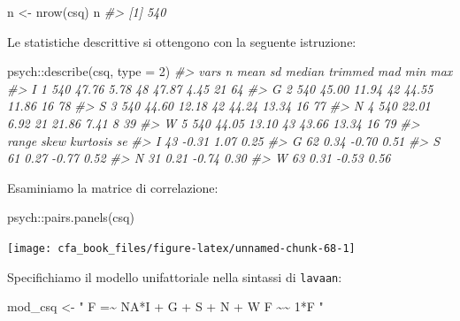 \documentclass[
  11pt,
]{krantz}
\makeatletter
\newenvironment{Shaded}{\begin{snugshade}}{\end{snugshade}}
\newcommand{\AttributeTok}[1]{\textcolor[rgb]{0.61,0.61,0.61}{#1}}
\newcommand{\CommentTok}[1]{\textcolor[rgb]{0.37,0.37,0.37}{\textit{#1}}}
\newcommand{\DecValTok}[1]{\textcolor[rgb]{0.06,0.06,0.06}{#1}}
\newcommand{\FunctionTok}[1]{\textcolor[rgb]{0,0,0}{#1}}
\newcommand{\NormalTok}[1]{#1}
\newcommand{\OtherTok}[1]{\textcolor[rgb]{0.37,0.37,0.37}{#1}}
\newcommand{\SpecialCharTok}[1]{\textcolor[rgb]{0,0,0}{#1}}
\newcommand{\StringTok}[1]{\textcolor[rgb]{0.5,0.5,0.5}{#1}}
\newenvironment{kframe}{%
\medskip{}
\setlength{\fboxsep}{.8em}
 \def\at@end@of@kframe{}%
 \ifinner\ifhmode%
  \def\at@end@of@kframe{\end{minipage}}%
  \begin{minipage}{\columnwidth}%
 \fi\fi%
 \def\FrameCommand##1{\hskip\@totalleftmargin \hskip-\fboxsep
 \colorbox{shadecolor}{##1}\hskip-\fboxsep
     \hskip-\linewidth \hskip-\@totalleftmargin \hskip\columnwidth}%
 \MakeFramed {\advance\hsize-\width
   \@totalleftmargin\z@ \linewidth\hsize
   \@setminipage}}%
 {\par\unskip\endMakeFramed%
 \at@end@of@kframe}
\renewenvironment{Shaded}{\begin{kframe}}{\end{kframe}}
\theoremstyle{definition}
\theoremstyle{definition}
\theoremstyle{definition}
\theoremstyle{definition}
\theoremstyle{remark}
\makeatother
\begin{document}
\begin{Shaded}
\begin{Highlighting}[]
\NormalTok{n }\OtherTok{\textless{}{-}} \FunctionTok{nrow}\NormalTok{(csq)}
\NormalTok{n}
\CommentTok{\#\textgreater{} [1] 540}
\end{Highlighting}
\end{Shaded}

Le statistiche descrittive si ottengono con la seguente istruzione:

\begin{Shaded}
\begin{Highlighting}[]
\NormalTok{psych}\SpecialCharTok{::}\FunctionTok{describe}\NormalTok{(csq, }\AttributeTok{type =} \DecValTok{2}\NormalTok{)}
\CommentTok{\#\textgreater{}   vars   n  mean    sd median trimmed   mad min max}
\CommentTok{\#\textgreater{} I    1 540 47.76  5.78     48   47.87  4.45  21  64}
\CommentTok{\#\textgreater{} G    2 540 45.00 11.94     42   44.55 11.86  16  78}
\CommentTok{\#\textgreater{} S    3 540 44.60 12.18     42   44.24 13.34  16  77}
\CommentTok{\#\textgreater{} N    4 540 22.01  6.92     21   21.86  7.41   8  39}
\CommentTok{\#\textgreater{} W    5 540 44.05 13.10     43   43.66 13.34  16  79}
\CommentTok{\#\textgreater{}   range  skew kurtosis   se}
\CommentTok{\#\textgreater{} I    43 {-}0.31     1.07 0.25}
\CommentTok{\#\textgreater{} G    62  0.34    {-}0.70 0.51}
\CommentTok{\#\textgreater{} S    61  0.27    {-}0.77 0.52}
\CommentTok{\#\textgreater{} N    31  0.21    {-}0.74 0.30}
\CommentTok{\#\textgreater{} W    63  0.31    {-}0.53 0.56}
\end{Highlighting}
\end{Shaded}

Esaminiamo la matrice di correlazione:

\begin{Shaded}
\begin{Highlighting}[]
\NormalTok{psych}\SpecialCharTok{::}\FunctionTok{pairs.panels}\NormalTok{(csq)}
\end{Highlighting}
\end{Shaded}

\begin{center}\texttt{[image: cfa\_book\_files/figure-latex/unnamed-chunk-68-1]} \end{center}

Specifichiamo il modello unifattoriale nella sintassi di \texttt{lavaan}:

\begin{Shaded}
\begin{Highlighting}[]
\NormalTok{mod\_csq }\OtherTok{\textless{}{-}} \StringTok{"}
\StringTok{   F =\textasciitilde{} NA*I + G + S + N + W}
\StringTok{   F \textasciitilde{}\textasciitilde{} 1*F}
\StringTok{"}
\end{Highlighting}
\end{Shaded}
\end{document}
